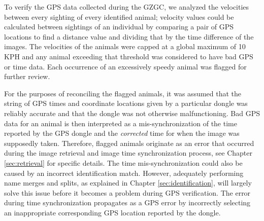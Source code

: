 To verify the GPS data collected during the GZGC, we analyzed the velocities between every sighting of every identified animal; velocity values could be calculated between sightings of an individual by comparing a pair of GPS locations to find a distance value and dividing that by the time difference of the images.  The velocities of the animals were capped at a global maximum of  10 KPH and any animal exceeding that threshold was considered to have bad GPS or time data.  Each occurrence of an excessively speedy animal was flagged for further review.

For the purposes of reconciling the flagged animals, it was assumed that the string of GPS times and coordinate locations given by a particular dongle was reliably accurate and that the dongle was not otherwise malfunctioning.  Bad GPS data for an animal is then interpreted as a mis-synchronization of the time reported by the GPS dongle and the \textit{corrected} time for when the image was supposedly taken.   Therefore, flagged animals originate as an error that occurred during the image retrieval and image time synchronization process, see Chapter \ref{sec:retrieval} for specific details.  The time mis-synchronization could also be caused by an incorrect identification match.  However, adequately performing name merges and splits, as explained in Chapter \ref{sec:identification}, will largely solve this issue before it becomes a problem during GPS verification.  The error during time synchronization propagates as a GPS error by incorrectly selecting an inappropriate corresponding GPS location reported by the dongle.

